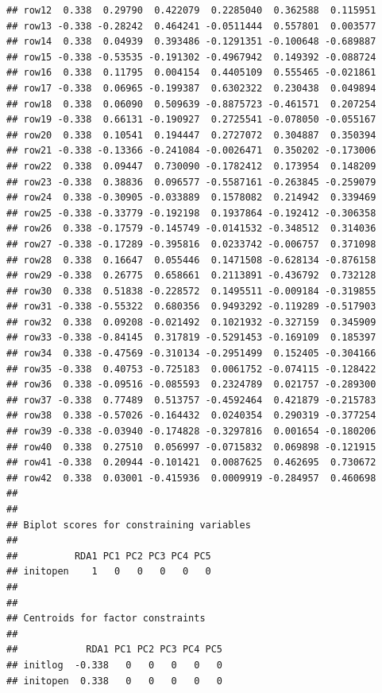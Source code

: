 \documentclass[
]{article}
\newenvironment{Shaded}{\begin{snugshade}}{\end{snugshade}}
\newcommand{\CommentTok}[1]{\textcolor[rgb]{0.56,0.35,0.01}{\textit{#1}}}
\newcommand{\FunctionTok}[1]{\textcolor[rgb]{0.13,0.29,0.53}{\textbf{#1}}}
\newcommand{\NormalTok}[1]{#1}
\newcommand{\SpecialCharTok}[1]{\textcolor[rgb]{0.81,0.36,0.00}{\textbf{#1}}}
\begin{document}
\begin{verbatim}
## row12  0.338  0.29790  0.422079  0.2285040  0.362588  0.115951
## row13 -0.338 -0.28242  0.464241 -0.0511444  0.557801  0.003577
## row14  0.338  0.04939  0.393486 -0.1291351 -0.100648 -0.689887
## row15 -0.338 -0.53535 -0.191302 -0.4967942  0.149392 -0.088724
## row16  0.338  0.11795  0.004154  0.4405109  0.555465 -0.021861
## row17 -0.338  0.06965 -0.199387  0.6302322  0.230438  0.049894
## row18  0.338  0.06090  0.509639 -0.8875723 -0.461571  0.207254
## row19 -0.338  0.66131 -0.190927  0.2725541 -0.078050 -0.055167
## row20  0.338  0.10541  0.194447  0.2727072  0.304887  0.350394
## row21 -0.338 -0.13366 -0.241084 -0.0026471  0.350202 -0.173006
## row22  0.338  0.09447  0.730090 -0.1782412  0.173954  0.148209
## row23 -0.338  0.38836  0.096577 -0.5587161 -0.263845 -0.259079
## row24  0.338 -0.30905 -0.033889  0.1578082  0.214942  0.339469
## row25 -0.338 -0.33779 -0.192198  0.1937864 -0.192412 -0.306358
## row26  0.338 -0.17579 -0.145749 -0.0141532 -0.348512  0.314036
## row27 -0.338 -0.17289 -0.395816  0.0233742 -0.006757  0.371098
## row28  0.338  0.16647  0.055446  0.1471508 -0.628134 -0.876158
## row29 -0.338  0.26775  0.658661  0.2113891 -0.436792  0.732128
## row30  0.338  0.51838 -0.228572  0.1495511 -0.009184 -0.319855
## row31 -0.338 -0.55322  0.680356  0.9493292 -0.119289 -0.517903
## row32  0.338  0.09208 -0.021492  0.1021932 -0.327159  0.345909
## row33 -0.338 -0.84145  0.317819 -0.5291453 -0.169109  0.185397
## row34  0.338 -0.47569 -0.310134 -0.2951499  0.152405 -0.304166
## row35 -0.338  0.40753 -0.725183  0.0061752 -0.074115 -0.128422
## row36  0.338 -0.09516 -0.085593  0.2324789  0.021757 -0.289300
## row37 -0.338  0.77489  0.513757 -0.4592464  0.421879 -0.215783
## row38  0.338 -0.57026 -0.164432  0.0240354  0.290319 -0.377254
## row39 -0.338 -0.03940 -0.174828 -0.3297816  0.001654 -0.180206
## row40  0.338  0.27510  0.056997 -0.0715832  0.069898 -0.121915
## row41 -0.338  0.20944 -0.101421  0.0087625  0.462695  0.730672
## row42  0.338  0.03001 -0.415936  0.0009919 -0.284957  0.460698
## 
## 
## Biplot scores for constraining variables
## 
##          RDA1 PC1 PC2 PC3 PC4 PC5
## initopen    1   0   0   0   0   0
## 
## 
## Centroids for factor constraints
## 
##            RDA1 PC1 PC2 PC3 PC4 PC5
## initlog  -0.338   0   0   0   0   0
## initopen  0.338   0   0   0   0   0
\end{verbatim}

\begin{Shaded}
\end{Shaded}
\end{document}
